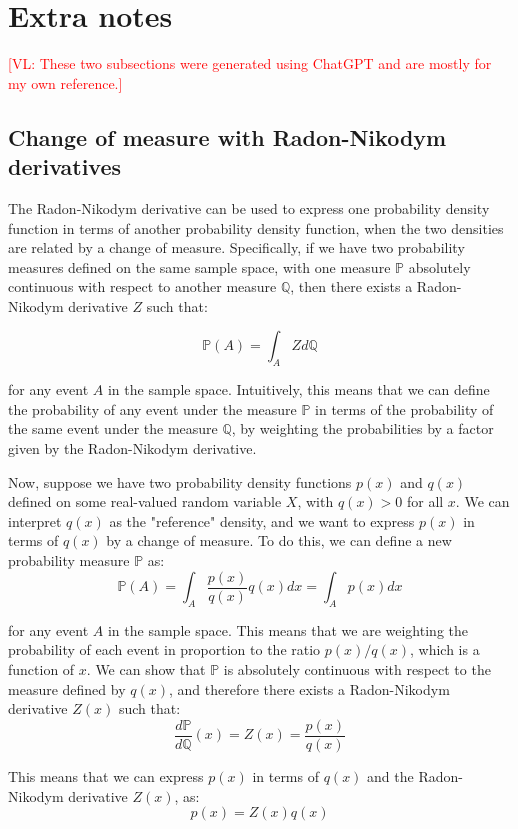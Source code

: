 \documentclass{article}
\newcommand{\vl}[1]{\textcolor{red}{[VL: #1]}}
\begin{document}
\section{Extra notes}

\vl{These two subsections were generated using ChatGPT and are mostly for my own reference.}

\subsection{Change of measure with Radon-Nikodym derivatives}
\label{sec:change_of_measure}

The Radon-Nikodym derivative can be used to express one probability density function in terms of another probability density function, when the two densities are related by a change of measure. Specifically, if we have two probability measures defined on the same sample space, with one measure $\mathbb{P}$ absolutely continuous with respect to another measure $\mathbb{Q}$, then there exists a Radon-Nikodym derivative $Z$ such that:

$$\mathbb{P}(A) = \int_A Z d\mathbb{Q}$$

for any event $A$ in the sample space. Intuitively, this means that we can define the probability of any event under the measure $\mathbb{P}$ in terms of the probability of the same event under the measure $\mathbb{Q}$, by weighting the probabilities by a factor given by the Radon-Nikodym derivative.

Now, suppose we have two probability density functions $p(x)$ and $q(x)$ defined on some real-valued random variable $X$, with $q(x)>0$ for all $x$. We can interpret $q(x)$ as the "reference" density, and we want to express $p(x)$ in terms of $q(x)$ by a change of measure. To do this, we can define a new probability measure $\mathbb{P}$ as:
$$\mathbb{P}(A) = \int_A \frac{p(x)}{q(x)} q(x) dx = \int_A p(x) dx$$

for any event $A$ in the sample space. This means that we are weighting the probability of each event in proportion to the ratio $p(x)/q(x)$, which is a function of $x$. We can show that $\mathbb{P}$ is absolutely continuous with respect to the measure defined by $q(x)$, and therefore there exists a Radon-Nikodym derivative $Z(x)$ such that:
$$\frac{d\mathbb{P}}{d\mathbb{Q}}(x) = Z(x) = \frac{p(x)}{q(x)}$$

This means that we can express $p(x)$ in terms of $q(x)$ and the Radon-Nikodym derivative $Z(x)$, as:
$$p(x) = Z(x) q(x)$$
\end{document}
